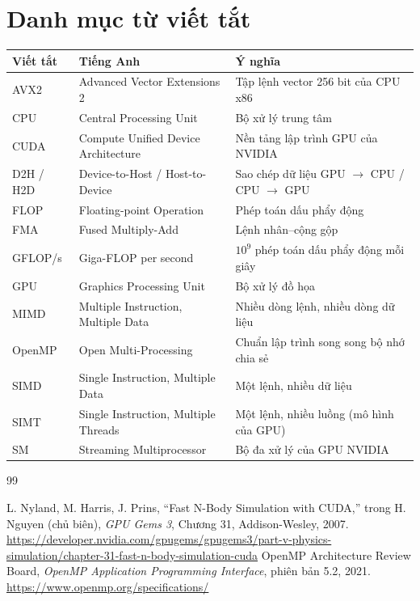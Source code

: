 \documentclass[12pt,a4paper,oneside]{report}
\begin{document}
\setcounter{page}{2}
\tableofcontents
\clearpage
\listoffigures
{}
\clearpage
\listoftables
{}

\chapter*{Danh mục từ viết tắt}
\begin{center}
\begin{tabular}{p{2.6cm}p{5.6cm}p{6.2cm}}
\toprule
\textbf{Viết tắt} & \textbf{Tiếng Anh} & \textbf{Ý nghĩa} \\
\midrule
AVX2 & Advanced Vector Extensions 2 & Tập lệnh vector 256 bit của CPU x86 \\
CPU & Central Processing Unit & Bộ xử lý trung tâm \\
CUDA & Compute Unified Device Architecture & Nền tảng lập trình GPU của NVIDIA \\
D2H / H2D & Device-to-Host / Host-to-Device & Sao chép dữ liệu GPU $\to$ CPU / CPU $\to$ GPU \\
FLOP & Floating-point Operation & Phép toán dấu phẩy động \\
FMA & Fused Multiply-Add & Lệnh nhân--cộng gộp \\
GFLOP/s & Giga-FLOP per second & $10^9$ phép toán dấu phẩy động mỗi giây \\
GPU & Graphics Processing Unit & Bộ xử lý đồ họa \\
MIMD & Multiple Instruction, Multiple Data & Nhiều dòng lệnh, nhiều dòng dữ liệu \\
OpenMP & Open Multi-Processing & Chuẩn lập trình song song bộ nhớ chia sẻ \\
SIMD & Single Instruction, Multiple Data & Một lệnh, nhiều dữ liệu \\
SIMT & Single Instruction, Multiple Threads & Một lệnh, nhiều luồng (mô hình của GPU) \\
SM & Streaming Multiprocessor & Bộ đa xử lý của GPU NVIDIA \\
\bottomrule
\end{tabular}
\end{center}

\clearpage
{}





\begin{thebibliography}{99}
 L. Nyland, M. Harris, J. Prins, ``Fast N-Body Simulation with CUDA,'' trong H. Nguyen (chủ biên), \emph{GPU Gems 3}, Chương 31, Addison-Wesley, 2007. \url{https://developer.nvidia.com/gpugems/gpugems3/part-v-physics-simulation/chapter-31-fast-n-body-simulation-cuda}
 OpenMP Architecture Review Board, \emph{OpenMP Application Programming Interface}, phiên bản 5.2, 2021. \url{https://www.openmp.org/specifications/}
\end{thebibliography}
\end{document}
